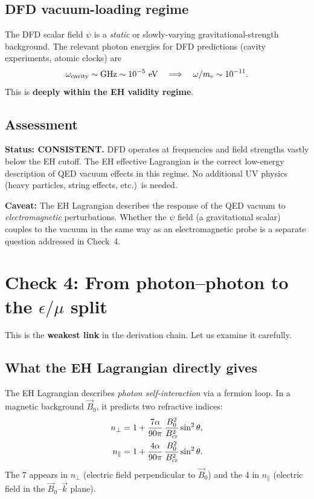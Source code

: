 \documentclass[12pt]{article}
\newcommand{\vB}{\vec{B}}
\begin{document}
\subsection{DFD vacuum-loading regime}

The DFD scalar field $\psi$ is a \emph{static} or slowly-varying
gravitational-strength background.  The relevant photon energies
for DFD predictions (cavity experiments, atomic clocks) are
\begin{equation}
\omega_{\rm cavity} \sim \text{GHz} \sim 10^{-5}~\text{eV}
\quad \Longrightarrow \quad
\omega / m_e \sim 10^{-11}.
\end{equation}
This is \textbf{deeply within the EH validity regime}.

\subsection{Assessment}

\textbf{Status: CONSISTENT.}  DFD operates at frequencies and field
strengths vastly below the EH cutoff.  The EH effective Lagrangian
is the correct low-energy description of QED vacuum effects in this
regime.  No additional UV physics (heavy particles, string effects,
etc.)\ is needed.

\textbf{Caveat:}  The EH Lagrangian describes the response of the QED
vacuum to \emph{electromagnetic} perturbations.  Whether the $\psi$
field (a gravitational scalar) couples to the vacuum in the same way
as an electromagnetic probe is a separate question addressed in
Check~4.

\section{Check 4: From photon--photon to the $\epsilon/\mu$ split}

This is the \textbf{weakest link} in the derivation chain.  Let us
examine it carefully.

\subsection{What the EH Lagrangian directly gives}

The EH Lagrangian describes \emph{photon self-interaction} via a
fermion loop.  In a magnetic background $\vB_0$, it predicts two
refractive indices:
\begin{align}
n_\perp &= 1 + \frac{7\alpha}{90\pi}\,
  \frac{B_0^2}{B_{\rm cr}^2}\sin^2\theta,
\label{eq:nperp}\\
n_\parallel &= 1 + \frac{4\alpha}{90\pi}\,
  \frac{B_0^2}{B_{\rm cr}^2}\sin^2\theta.
\label{eq:npar}
\end{align}
The 7 appears in $n_\perp$ (electric field perpendicular to $\vB_0$)
and the 4 in $n_\parallel$ (electric field in the $\vB_0$--$\vec{k}$
plane).
\end{document}
